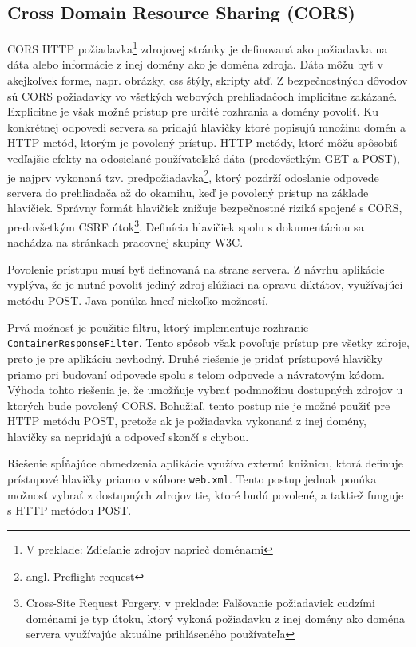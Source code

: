 \documentclass[12pt,oneside]{fithesis2}
\begin{document}
      		\subsection{Cross Domain Resource Sharing (CORS)}
      		\par CORS HTTP požiadavka\footnote{V preklade: Zdieľanie zdrojov naprieč doménami} zdrojovej stránky je definovaná ako požiadavka na dáta alebo informácie z inej domény ako je doména zdroja. Dáta môžu byť v akejkoľvek forme, napr. obrázky, css štýly, skripty atď. Z bezpečnostných dôvodov sú CORS požiadavky vo všetkých webových prehliadačoch implicitne zakázané. Explicitne je však možné prístup pre určité rozhrania a domény povoliť. Ku konkrétnej odpovedi servera sa pridajú hlavičky ktoré popisujú množinu domén a HTTP metód, ktorým je povolený prístup. HTTP metódy, ktoré môžu spôsobiť vedľajšie efekty na odosielané používateľské dáta (predovšetkým GET a POST), je najprv vykonaná tzv. predpožiadavka\footnote{angl. Preflight request}, ktorý pozdrží odoslanie odpovede servera do prehliadača až do okamihu, keď je povolený prístup na základe hlavičiek\cite{mozilla2015}. Správny formát hlavičiek znižuje bezpečnostné riziká spojené s CORS, predovšetkým CSRF útok\footnote{Cross-Site Request Forgery, v preklade: Falšovanie požiadaviek cudzími doménami je typ útoku, ktorý vykoná požiadavku z inej domény ako doména servera využívajúc aktuálne prihláseného používateľa}\cite{sof4}. Definícia hlavičiek spolu s dokumentáciou sa nachádza na stránkach pracovnej skupiny W3C\cite{w3c2014}.
      		\par Povolenie prístupu musí byť definovaná na strane servera. Z návrhu aplikácie vyplýva, že je nutné povoliť jediný zdroj slúžiaci na opravu diktátov, využívajúci metódu POST. Java ponúka hneď niekoľko možností.
      		\par Prvá možnosť je použitie filtru, ktorý implementuje rozhranie \texttt{ContainerResponseFilter}\cite{matei14}\cite{sof3}. Tento spôsob však povoľuje prístup pre všetky zdroje, preto je pre aplikáciu nevhodný. Druhé riešenie je pridať prístupové hlavičky priamo pri budovaní odpovede spolu s telom odpovede a návratovým kódom. Výhoda tohto riešenia je, že umožňuje vybrať podmnožinu dostupných zdrojov u ktorých bude povolený CORS. Bohužiaľ, tento postup nie je možné použiť pre HTTP metódu POST, pretože ak je požiadavka vykonaná z inej domény, hlavičky sa nepridajú a odpoveď skončí s chybou\cite{sof2}. 
      		\par Riešenie spĺňajúce obmedzenia aplikácie využíva externú knižnicu\cite{dzhuvinov15}, ktorá definuje prístupové hlavičky priamo v súbore \texttt{web.xml}. Tento postup jednak ponúka možnosť vybrať z dostupných zdrojov tie, ktoré budú povolené, a taktiež funguje s HTTP metódou POST\cite{sof2}.
      		
\end{document}
